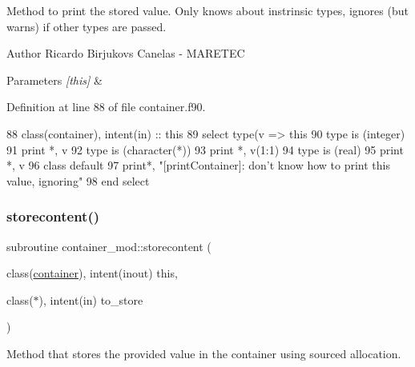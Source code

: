 Method to print the stored value. Only knows about instrinsic types, ignores (but warns) if other types are passed. 

\begin{DoxyAuthor}{Author}
Ricardo Birjukovs Canelas -\/ M\+A\+R\+E\+T\+EC 
\end{DoxyAuthor}

\begin{DoxyParams}{Parameters}
{\em \mbox{[}this\mbox{]}} & \\
\hline
\end{DoxyParams}


Definition at line 88 of file container.\+f90.


\begin{DoxyCode}
88     \textcolor{keywordtype}{class}(container), \textcolor{keywordtype}{intent(in)} :: this
89     \textcolor{keywordflow}{select type}(v => this%
90 \textcolor{keywordflow}{    type is} (integer)
91         print *, v
92 \textcolor{keywordflow}{    type is} (\textcolor{keywordtype}{character}(*))
93         print *, v(1:1)
94 \textcolor{keywordflow}{    type is} (real)
95         print *, v
96 \textcolor{keywordflow}{        class default}
97         print*, \textcolor{stringliteral}{"[printContainer]: don't know how to print this value, ignoring"}
98 \textcolor{keywordflow}{    end select}
\end{DoxyCode}
\mbox{\label{namespacecontainer__mod_ace49cee012b6cd3c41c03556ab0dd884}} 
\subsubsection{\texorpdfstring{storecontent()}{storecontent()}}
{\footnotesize\ttfamily subroutine container\+\_\+mod\+::storecontent (\begin{DoxyParamCaption}\item[{class(\mbox{\hyperlink{structcontainer__mod_1_1container}{container}}), intent(inout)}]{this,  }\item[{class($\ast$), intent(in)}]{to\+\_\+store }\end{DoxyParamCaption})\hspace{0.3cm}{\ttfamily [private]}}



Method that stores the provided value in the container using sourced allocation. 

